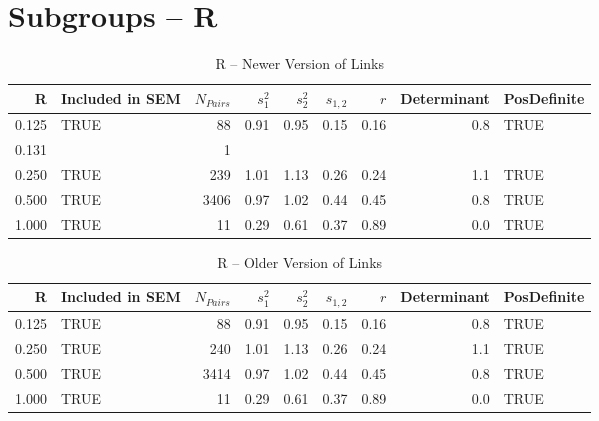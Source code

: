 \documentclass{article}\usepackage{graphicx, color}
\begin{document}
\section{Subgroups --  R }%
\begin{table}[ht]
\centering
\begin{tabular}{rlrrrrrrl}
  \hline
R & Included in SEM & $N_{Pairs}$ & $s_1^2$ & $s_2^2$ & $s_{1,2}$ & $r$ & Determinant & PosDefinite \\ 
  \hline
0.125 & TRUE & 88 & 0.91 & 0.95 & 0.15 & 0.16 & 0.8 & TRUE \\ 
  0.131 &  & 1 &  &  &  &  &  &  \\ 
  0.250 & TRUE & 239 & 1.01 & 1.13 & 0.26 & 0.24 & 1.1 & TRUE \\ 
  0.500 & TRUE & 3406 & 0.97 & 1.02 & 0.44 & 0.45 & 0.8 & TRUE \\ 
  1.000 & TRUE & 11 & 0.29 & 0.61 & 0.37 & 0.89 & 0.0 & TRUE \\ 
   \hline
\end{tabular}
\caption{R -- Newer Version of Links} 
\end{table}
\begin{table}[ht]
\centering
\begin{tabular}{rlrrrrrrl}
  \hline
R & Included in SEM & $N_{Pairs}$ & $s_1^2$ & $s_2^2$ & $s_{1,2}$ & $r$ & Determinant & PosDefinite \\ 
  \hline
0.125 & TRUE & 88 & 0.91 & 0.95 & 0.15 & 0.16 & 0.8 & TRUE \\ 
  0.250 & TRUE & 240 & 1.01 & 1.13 & 0.26 & 0.24 & 1.1 & TRUE \\ 
  0.500 & TRUE & 3414 & 0.97 & 1.02 & 0.44 & 0.45 & 0.8 & TRUE \\ 
  1.000 & TRUE & 11 & 0.29 & 0.61 & 0.37 & 0.89 & 0.0 & TRUE \\ 
   \hline
\end{tabular}
\caption{R -- Older Version of Links} 
\end{table}
\newpage 
\end{document}
